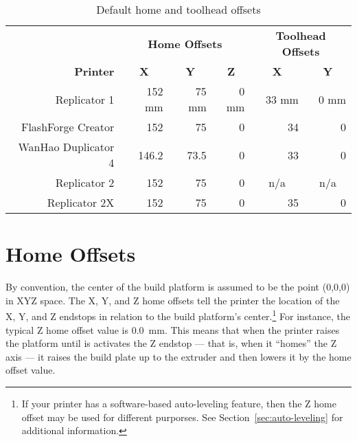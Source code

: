 \begin{table}[!ht]
\centering
\begin{tabular}{r | r r r | r r}
\hline
&\multicolumn{3}{c|}{\textbf{Home Offsets}}&\multicolumn{2}{c}{\textbf{Toolhead Offsets}} \\
\textbf{Printer}&\multicolumn{1}{c}{\textbf{X}}&\multicolumn{1}{c}{\textbf{Y}}&\multicolumn{1}{c|}{\textbf{Z}}&\multicolumn{1}{c}{\textbf{X}}&\multicolumn{1}{c}{\textbf{Y}} \\
\hline
Replicator 1& 152 mm & 75 mm & 0 mm & 33 mm & 0 mm \\
FlashForge Creator& 152 \hphantom{mm} & 75 \hphantom{mm} & 0 \hphantom{mm} & 34 \hphantom{mm} & 0 \hphantom{mm}  \\
WanHao Duplicator 4& 146.2 \hphantom{mm} & 73.5 \hphantom{mm} & 0 \hphantom{mm} & 33 \hphantom{mm} & 0 \hphantom{mm} \\
Replicator 2& 152 \hphantom{mm} & 75 \hphantom{mm} & 0 \hphantom{mm} &\multicolumn{1}{c}{n/a} & \multicolumn{1}{c}{n/a} \\
Replicator 2X& 152 \hphantom{mm} & 75 \hphantom{mm} & 0 \hphantom{mm} & 35 \hphantom{mm} & 0 \hphantom{mm} \\ [0.5ex]
\hline
\end{tabular}
\caption[Default home and toolhead offsets]{Default home and toolhead offsets}
\label{tab:default-offsets}
\end{table}


\section{Home Offsets} \label{sec:home-offsets}

By convention, the center of the build platform is assumed to be the point (0,0,0) in XYZ space.  The X, Y, and Z \glspl{home offset} tell the printer the location of the X, Y, and Z endstops in relation to the build platform's center.\footnote{If your printer has a software-based auto-leveling feature, then the Z home offset may be used for different purporses.  See Section~\ref{sec:auto-leveling} for additional information.}  For instance, the typical Z home offset value is 0.0~mm.  This means that when the printer raises the platform until is activates the Z endstop --- that is, when it ``homes'' the Z axis --- it raises the build plate up to the extruder and then lowers it by the home offset value.

